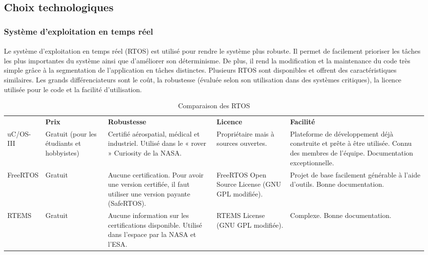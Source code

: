 \subsection{Choix technologiques}
	\subsubsection*{Système d'exploitation en temps réel}
		\paragraph*{}
		Le système d’exploitation en temps réel (RTOS) est utilisé pour rendre le système plus robuste. Il permet de facilement prioriser les tâches les plus importantes du système ainsi que d’améliorer son déterminisme. De plus, il rend la modification et la maintenance du code très simple grâce à la segmentation de l’application en tâches distinctes. Plusieurs RTOS sont disponibles et offrent des caractéristiques similaires. Les grands différenciateurs sont le coût, la robustesse (évaluée selon son utilisation dans des systèmes critiques), la licence utilisée pour le code et la facilité d’utilisation.

		\begin{table}[H]
			\centering
			\caption{Comparaison des RTOS}
			\label{my-label}
			\renewcommand{\arraystretch}{1.3}
			\begin{tabular}{|p{3cm}|p{3cm}|p{3cm}|p{3cm}|p{3cm}|}
				\hline &
				\textbf{Prix} & \textbf{Robustesse} & \textbf{Licence} & \textbf{Facilité}
				\\ \hhline{|=|=|=|=|=|}
				uC/OS-III &
				Gratuit (pour les étudiants et hobbyistes) &
				Certifié aérospatial, médical et industriel.
				Utilisé dans le « rover » Curiosity de la NASA. &
				Propriétaire mais à sources ouvertes. &
				Plateforme de développement déjà construite et prête à être utilisée.
				Connu des membres de l’équipe.
				Documentation exceptionnelle.
				\\ \hline
				FreeRTOS &
				Gratuit &
				Aucune certification. Pour avoir une version certifiée, il faut utiliser une version payante (SafeRTOS). &
				FreeRTOS Open Source License (GNU GPL modifiée). &
				Projet de base facilement générable à l’aide d’outils.
				Bonne documentation.
				\\ \hline
				RTEMS &
				Gratuit &
				Aucune information sur les certifications disponible.
				Utilisé dans l’espace par la NASA et l’ESA. &
				RTEMS License (GNU GPL modifiée). &
				Complexe.
				Bonne documentation.                                                                              \\ \hline
			\end{tabular}
		\end{table}

